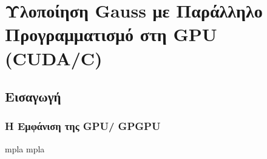 \section{ Υλοποίηση {\lt Gauss} με Παράλληλο Προγραμματισμό στη {\lt GPU (CUDA/C)}}

\subsection{Εισαγωγή}

\subsubsection{Η Εμφάνιση της {\lt GPU/ GPGPU}}
mpla mpla